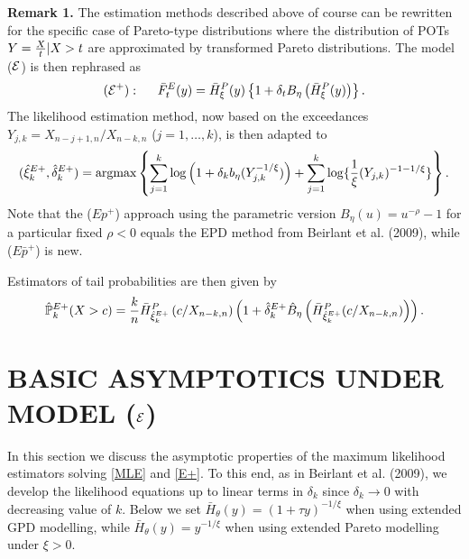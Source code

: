 \documentclass[twoside,leqno,11pt]{article}
\begin{document}
\noindent
 {\bf Remark 1.}  The estimation methods described above of course can be rewritten for the specific case of Pareto-type distributions where the distribution of POTs $Y={X \over t}|X>t$ are approximated by transformed Pareto distributions. The model ($\cal{E}$) is then rephrased as 
 \[
({\cal{E}^+}) : \hspace{0.5cm} \bar{F}^E_t(y)= \bar{H}^{P}_\xi (y)\left\{1 +\delta_t B_{\eta} \left( \bar{H}^{P}_\xi (y) \right) \right\}. 
\]
The likelihood estimation method, now based on the exceedances $Y_{j,k}= X_{n-j+1,n}/X_{n-k,n}$ ($j=1,\ldots,k$), is then adapted to
  \begin{equation}
(\hat{\xi}^{E+}_k, \hat{\delta}^{E+}_k)=
\mbox{argmax} \left\{
\sum_{j=1}^k \log\left( 
1+\delta_k b_{\eta}(Y_{j,k}^{-1/\xi}) \right)+
  \sum_{j=1}^k
\log \{{1 \over \xi} (Y_{j,k})^{-1-1/\xi} \}
 \right\}.
\label{E+}
\end{equation}
Note that the ($Ep^+$) approach using the parametric version $B_\eta (u) = u^{-\rho}-1$ for a particular fixed $\rho <0$  equals the EPD method from Beirlant et al. (2009), while ($E\bar{p}^+$) is new. 

\vspace{0.2cm}\noindent
Estimators of tail probabilities are then given  by  
\[
\hat{\mathbb{P}}_k^{E+}(X>c) = {k \over n} \bar{H}^{P}_{\hat{\xi}^{E+}_k}\left( c/X_{n-k,n} \right) 
\left( 1+ \hat{\delta}_k^{E+} \hat{B}_{\eta}\left(\bar{H}^{P}_{\hat{\xi}^{E+}_k} (c/X_{n-k,n})\right)\right).  
\]


\section{BASIC ASYMPTOTICS UNDER MODEL (${\cal E}$)}


In this section we discuss the asymptotic properties of the maximum likelihood estimators solving \eqref{MLE} and \eqref{E+}. To this end, as in Beirlant et al. (2009), we develop the likelihood equations up to linear terms in $\delta_k$ since $ \delta_k \to 0$ with decreasing value of $k$. 
Below we set $\bar{H}_{\theta}(y)=(1+\tau y)^{-1/\xi}$ when using extended GPD modelling, while $\bar{H}_{\theta}(y)=y^{-1/\xi}$ when using extended Pareto modelling under $\xi >0$.
\end{document}
